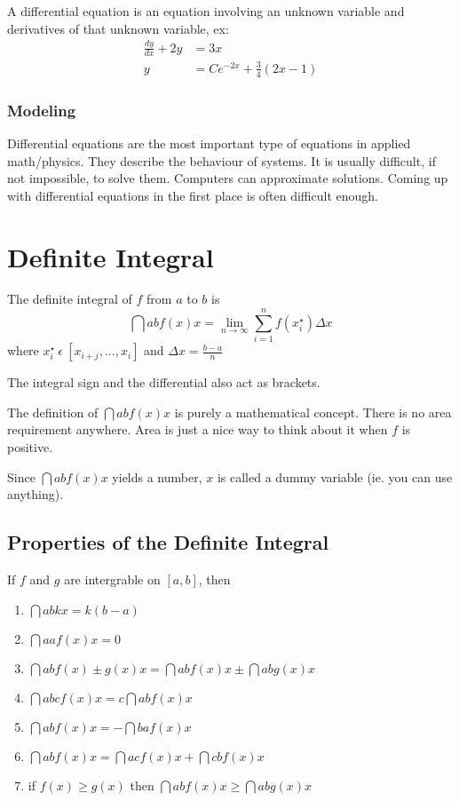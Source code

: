 \documentclass[12pt]{article}
\begin{document}
A differential equation is an equation involving an unknown variable and derivatives of that unknown variable, ex:
\begin{align*}
\frac{dy}{dx} + 2y &= 3x\\
y &= Ce^{-2x} + \frac{3}{4}(2x-1)
\end{align*}

\subsubsection*{Modeling}
Differential equations are the most important type of equations in applied math/physics. They describe the behaviour of systems. It is usually difficult, if not impossible, to solve them. Computers can approximate solutions. Coming up with differential equations in the first place is often difficult enough.

\section*{Definite Integral}
The definite integral of $f$ from $a$ to $b$ is \[ \dint{a}{b}{f(x)}{x} = \lim_{n\to\infty}\sum_{i=1}^n f(x_i^\star)\Delta x \] where $x_i^\star\ \epsilon\ [x_{i+j}, ..., x_{i}]$ and $\Delta x = \frac{b-a}{n}$

The integral sign and the differential also act as brackets.

The definition of $\dint{a}{b}{f(x)}{x}$ is purely a mathematical concept. There is no area requirement anywhere. Area is just a nice way to think about it when $f$ is positive.

Since $\dint{a}{b}{f(x)}{x}$ yields a number, $x$ is called a dummy variable (ie. you can use anything).

\subsection*{Properties of the Definite Integral}
If $f$ and $g$ are intergrable on $[a,b]$, then
\begin{enumerate}
\item $\dint{a}{b}{k}{x} = k(b-a)$
\item $\dint{a}{a}{f(x)}{x} = 0$
\item $\dint{a}{b}{f(x)\pm g(x)}{x} = \dint{a}{b}{f(x)}{x} \pm \dint{a}{b}{g(x)}{x}$
\item $\dint{a}{b}{cf(x)}{x} = c\dint{a}{b}{f(x)}{x}$
\item $\dint{a}{b}{f(x)}{x} = -\dint{b}{a}{f(x)}{x}$
\item $\dint{a}{b}{f(x)}{x} = \dint{a}{c}{f(x)}{x} + \dint{c}{b}{f(x)}{x}$
\item if $f(x) \geq g(x)$ then $\dint{a}{b}{f(x)}{x} \geq \dint{a}{b}{g(x)}{x}$
\end{enumerate}
\end{document}
